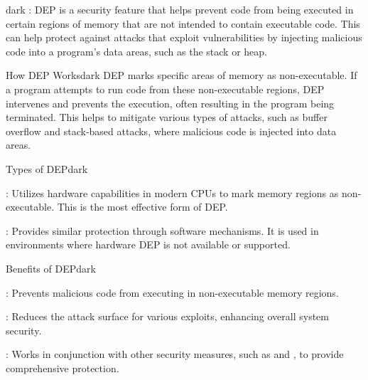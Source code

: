 \label{Data Execution Prevention (DEP)}
\begin{baseBoxThree}{}{dark}
    \bigskip
    : DEP is a security feature that helps prevent code from being executed in certain regions of memory that are not intended to contain executable code. This can help protect against attacks that exploit vulnerabilities by injecting malicious code into a program's data areas, such as the stack or heap.
    \bigskip
    \begin{baseBoxThree}{How DEP Works}{dark}
        \smallskip
        DEP marks specific areas of memory as non-executable.
        If a program attempts to run code from these non-executable regions, DEP intervenes and prevents the execution, often resulting in the program being terminated.
        This helps to mitigate various types of attacks, such as buffer overflow and stack-based attacks, where malicious code is injected into data areas.
        \smallskip
    \end{baseBoxThree}
    \smallskip
    \begin{baseBoxThree}{Types of DEP}{dark}
        \smallskip
        \begin{posnexItemize}
            \item[\sA] : Utilizes hardware capabilities in modern CPUs to mark memory regions as non-executable. This is the most effective form of DEP.
            \item[\sA] : Provides similar protection through software mechanisms. It is used in environments where hardware DEP is not available or supported.
        \end{posnexItemize}
        \smallskip
    \end{baseBoxThree}
    \smallskip
    \begin{baseBoxThree}{Benefits of DEP}{dark}
        \smallskip
        \begin{posnexItemize}
            \item[\sA] : Prevents malicious code from executing in non-executable memory regions.
            \item[\sA] : Reduces the attack surface for various exploits, enhancing overall system security.
            \item[\sA] : Works in conjunction with other security measures, such as  and , to provide comprehensive protection.
        \end{posnexItemize}
        \smallskip
    \end{baseBoxThree}
    \smallskip
\end{baseBoxThree}

